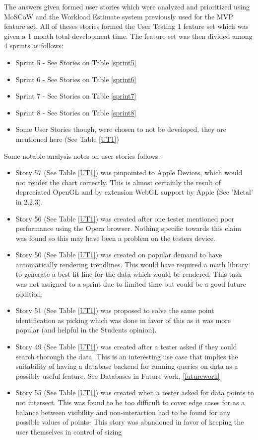 The answers given formed user stories which were analyzed and prioritized using MoSCoW and the Workload Estimate system previously used for the MVP feature set. All of theses stories formed the User Testing 1 feature set which was given a 1 month total development time. The feature set was then divided among 4 sprints as follows:

\begin{itemize}
    \item Sprint 5 - See Stories on Table \ref{sprint5}
    \item Sprint 6 - See Stories on Table \ref{sprint6}
    \item Sprint 7 - See Stories on Table \ref{sprint7}
    \item Sprint 8 - See Stories on Table \ref{sprint8}
    \item Some User Stories though, were chosen to not be developed, they are mentioned here (See Table \ref{UT1})
\end{itemize}

Some notable analysis notes on user stories follows:

\begin{itemize}
    \item Story 57 (See Table \ref{UT1}) was pinpointed to Apple Devices, which would not render the chart correctly. This is almost certainly the result of depreciated OpenGL and by extension WebGL support by Apple (See 'Metal' in 2.2.3).
    \item Story 56 (See Table \ref{UT1}) was created after one tester mentioned poor performance using the Opera browser. Nothing specific towards this claim was found so this may have been a problem on the testers device.
    \item Story 50 (See Table \ref{UT1}) was created on popular demand to have automatically rendering trendlines. This would have required a math library to generate a best fit line for the data which would be rendered. This task was not assigned to a sprint due to limited time but could be a good future addition.
    \item Story 51 (See Table \ref{UT1}) was proposed to solve the same point identification as picking which was done in favor of this as it was more popular (and helpful in the Students opinion).
    \item Story 49 (See Table \ref{UT1}) was created after a tester asked if they could search thorough the data. This is an interesting use case that implies the suitability of having a database backend for running queries on data as a possibly useful feature. See Databases in Future work, \ref{futurework}
    \item Story 55 (See Table \ref{UT1}) was created when a tester asked for data points to not intersect. This was found to be too difficult to cover edge cases for as a balance between visibility and non-interaction had to be found for any possible values of points- This story was abandoned in favor of keeping the user themselves in control of sizing
\end{itemize}

